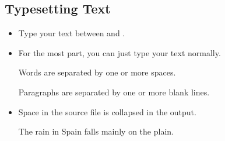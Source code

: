 \documentclass[aspectratio=169]{beamer}
\begin{document}
\subsection{Typesetting Text}
\begin{frame}[fragile]{\insertsubsection{}}
\small
\begin{itemize}
\item Type your text between  and .
\item For the most part, you can just type your text normally.
\begin{exampletwouptiny}
Words are separated by one or more
spaces.

Paragraphs are separated by one
or more blank lines.
\end{exampletwouptiny}
\item Space in the source file is collapsed in the output.
\begin{exampletwouptiny}
The   rain       in Spain
falls mainly on the plain.
\end{exampletwouptiny}
\end{itemize}
\end{frame}
\end{document}
